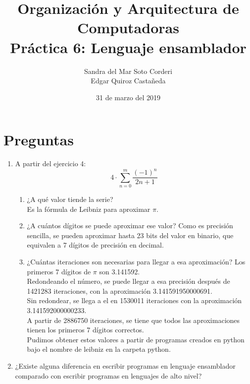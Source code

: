 \documentclass{article}
\begin{document}
    \title{
        Organización y Arquitectura de Computadoras \\
        Práctica 6: Lenguaje ensamblador \\
    }
    \date{
        31 de marzo del 2019
    }
    \author{
        Sandra del Mar Soto Corderi \\
        Edgar Quiroz Castañeda
    }
    \maketitle

    \section{Preguntas}
    \begin{enumerate}
        \item {
        	A partir del ejercicio 4:
            \[4\cdot\sum_{n=0}^{m}{\frac{(-1)^{n}}{2n+1}}\]
            \begin{enumerate}
                \item ¿A qué valor tiende la serie?\\
                Es la fórmula de Leibniz\cite{wolfram pi} para aproximar $\pi$.\\
                
                \item ¿A cuántos dígitos se puede aproximar ese valor?
                Como es precisión sencilla, se pueden aproximar hasta 23 bits
                del valor en binario, que equivalen a 7 dígitos de precisión en
                decimal\cite{ieee flot32 std}.\\
                
                \item ¿Cuántas iteraciones son necesarias para llegar a esa
                aproximación?               
                Los primeros 7 dígitos de $\pi$ son 3.141592\cite{pi dig}.\\
                Redondeando el número, se puede llegar a esa precisión después
                de 1421283 iteraciones,  con la aproximación 3.141591950000691. \\
                Sin redondear, se llega a el en 1530011 iteraciones con la
                aproximación 3.141592000000233.\\
                A partir de 2886750 iteraciones, se tiene que todos las
                aproximaciones tienen los primeros 7 dígitos correctos.\\
                Pudimos obtener estos valores a partir de programas creados en python bajo el nombre de leibniz en la carpeta python.
            \end{enumerate}
        }
        \item ¿Existe alguna diferencia en escribir programas en lenguaje 
        ensamblador comparado con escribir programas en lenguajes de alto nivel?\\
        

\end{enumerate}
\end{document}
